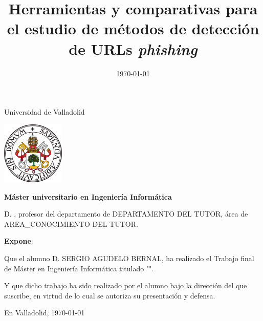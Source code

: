 \documentclass[a4paper,12pt,oneside,oldfontcommands]{memoir}
\title{Herramientas y comparativas para el estudio de métodos de detección de
URLs \textit{phishing}}
\author{\nombre}
\date{\today}
\newcommand{\nombre}[0]{SERGIO AGUDELO BERNAL} %
\newcommand{\depto}[0]{DEPARTAMENTO DEL TUTOR}
\newcommand{\areac}[0]{AREA\_CONOCIMIENTO DEL TUTOR}
\begin{document}
\maketitle


\newpage\null\thispagestyle{empty}\newpage


\thispagestyle{empty}


\noindent
\begin{center}%
	{\noindent\Huge Universidad de Valladolid}\vspace{.5cm}%

	\begin{center}%
		\includegraphics[height=3cm]{img/escudoUVA} \hspace{1cm}
	\end{center}%

	{\noindent\Large \textbf{Máster universitario en Ingeniería Informática}}\vspace{.5cm}%
\end{center}%



\noindent D. \makeatletter\@tutor\makeatother, profesor del departamento de \depto, área de \areac.

\noindent \textbf{Expone}:

\noindent Que el alumno D. \nombre, %
ha realizado el Trabajo final de Máster en Ingeniería Informática titulado "\makeatletter\textsc{\@title{}}\makeatother".

\noindent Y que dicho trabajo ha sido realizado por el alumno bajo la dirección del que suscribe, en virtud de lo cual se autoriza su presentación y defensa.

\begin{center} %
	En Valladolid, {\large \today}
\end{center}

\vfill\vfill\vfill

\end{document}
